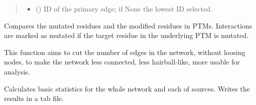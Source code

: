 \documentclass[letterpaper,10pt,english]{sphinxmanual}
\begin{document}
\begin{fulllineitems}
\begin{fulllineitems}
\begin{quote}
\begin{description}
\begin{itemize}
\item {} 
 () \textendash{} ID of the primary edge;
if None the lowest ID selected.

\end{itemize}

\end{description}\end{quote}

\end{fulllineitems}


\begin{fulllineitems}
\label{\detokenize{main:pypath.main.PyPath.mutated_edges}}
Compares the mutated residues and the modified residues in PTMs.
Interactions are marked as mutated if the target residue in the
underlying PTM is mutated.

\end{fulllineitems}


\begin{fulllineitems}
\label{\detokenize{main:pypath.main.PyPath.network_filter}}
This function aims to cut the number of edges in the network,
without loosing nodes, to make the network less connected,
less hairball-like, more usable for analysis.

\end{fulllineitems}


\begin{fulllineitems}
\label{\detokenize{main:pypath.main.PyPath.network_stats}}
Calculates basic statistics for the whole network
and each of sources. Writes the results in a tab file.

\end{fulllineitems}



\end{fulllineitems}
\end{document}
